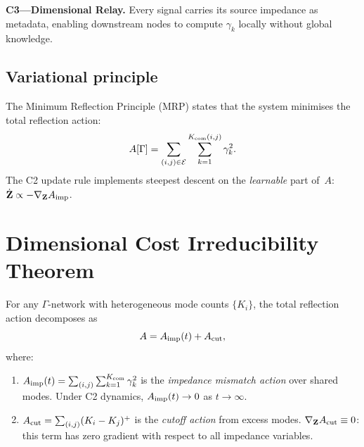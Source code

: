 \documentclass[aps,pre,twocolumn,superscriptaddress,floatfix]{revtex4-2}
\begin{document}
\textbf{C3---Dimensional Relay.}
Every signal carries its source impedance as metadata,
enabling downstream nodes to compute $\gamma_k$ locally
without global knowledge.

\subsection{Variational principle}
\label{sec:action}

The Minimum Reflection Principle (MRP) states that the
system minimises the total reflection action:
\begin{equation}
  A[\Gamma]
  = \sum_{(i,j) \in \mathcal{E}}
    \sum_{k=1}^{K_{\text{com}}(i,j)} \gamma_k^2.
  \label{eq:action}
\end{equation}
The C2 update rule implements steepest descent on the
\emph{learnable} part of~$A$:
$\dot{\mathbf{Z}} \propto -\nabla_{\mathbf{Z}} A_{\text{imp}}$.


\section{Dimensional Cost Irreducibility Theorem}
\label{sec:theorem}

\begin{theorem}
\label{thm:irreducibility}
For any $\Gamma$-network with heterogeneous mode counts
$\{K_i\}$, the total reflection action decomposes as
\begin{equation}
  A = A_{\text{imp}}(t) + A_{\text{cut}},
  \label{eq:decomposition}
\end{equation}
where:
\begin{enumerate}
\item
$A_{\text{imp}}(t) = \sum_{(i,j)} \sum_{k=1}^{K_{\text{com}}} \gamma_k^2$
is the \emph{impedance mismatch action} over shared modes.
Under C2 dynamics, $A_{\text{imp}}(t) \to 0$ as $t \to \infty$.

\item
$A_{\text{cut}} = \sum_{(i,j)} (K_i - K_j)^+$
is the \emph{cutoff action} from excess modes.
$\nabla_{\mathbf{Z}} A_{\text{cut}} \equiv 0$:
this term has zero gradient with respect to all impedance
variables.
\end{enumerate}
\end{theorem}
\end{document}
